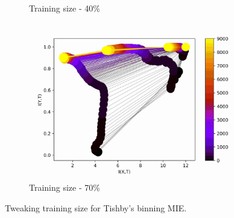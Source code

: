 \documentclass[dissertation.tex]{subfiles}
\begin{document}
\begin{figure}[ht]
\begin{subfigure}[t]{0.32\textwidth}
{      Training size - 40\%
    }
    \label{figBinningTS40}
  \end{subfigure}
  \begin{subfigure}[t]{0.32\textwidth}
    \centering
    \includegraphics[width=\textwidth]{figs/eval/trainingSize/Binning70.jpg}
    \caption{
      Training size - 70\%
    }
    \label{figBinningTS70}
  \end{subfigure}
  \caption{
      Tweaking training size for Tishby's binning MIE.
    }
  \label{figTS}
\end{figure}
\end{document}
